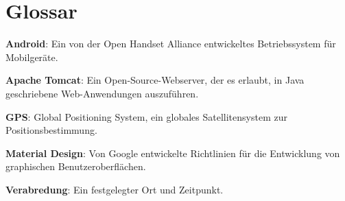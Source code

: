 \documentclass[parskip=full,11pt]{scrartcl}
\begin{document}
\pagebreak
\section{Glossar}

\textbf{Android}:
Ein von der Open Handset Alliance entwickeltes Betriebssystem für Mobilgeräte.

\textbf{Apache Tomcat}:
Ein Open-Source-Webserver, der es erlaubt, in Java geschriebene Web-Anwendungen
auszuführen.

\textbf{GPS}:
Global Positioning System, ein globales Satellitensystem zur
Positionsbestimmung.

\textbf{Material Design}:
Von Google entwickelte Richtlinien für die Entwicklung von graphischen
Benutzeroberflächen.

\textbf{Verabredung}:
Ein festgelegter Ort und Zeitpunkt.
\end{document}
